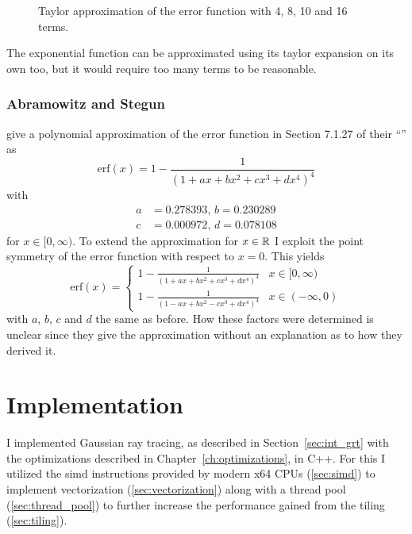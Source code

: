 \documentclass[a4paper, 11pt]{memoir}
\newcommand*{\erf}{\text{erf}}
\begin{document}
    \begin{figure}[t]
        \centering
        
        \caption{Taylor approximation of the error function with 4, 8, 10 and 16 terms.}
        \label{fig:taylor_erf}
    \end{figure}

    The exponential function can be approximated using its taylor expansion on its own too, but it would require too
    many terms to be reasonable.

    \subsection{Abramowitz and Stegun}
    \label{sec:abrasteg}
    \citeauthor{AbraSteg72} give a polynomial approximation of the error function in Section 7.1.27 of their
    \enquote{}\cite{AbraSteg72} as
    \begin{equation}
        \erf{(x)} = 1 - \frac{1}{(1 + ax + bx^2 + cx^3 + dx^4)^4}
        \label{eq:abrasteg_positive}
    \end{equation}
    with
    \begin{equation}
        \begin{aligned}
            a &= 0.278393,\,
            b = 0.230289\\
            c &= 0.000972,\,
            d = 0.078108
        \end{aligned}
        \label{eq:abrasteg_defs}
    \end{equation}
    for $x \in [0, \infty)$. To extend the approximation for $x \in \mathbb{R}$ I exploit the point symmetry of the error function
    with respect to $x = 0$. This yields
    \begin{equation}
        \erf{(x)} = \begin{cases}
            1 - \frac{1}{(1 + ax + bx^2 + cx^3 + dx^4)^4} & x \in [0, \infty)\\
            1 - \frac{1}{(1 - ax + bx^2 - cx^3 + dx^4)^4} & x \in (-\infty, 0)
        \end{cases}
        \label{eq:abrasteg}
    \end{equation}
    with $a$, $b$, $c$ and $d$ the same as before. How these factors were determined is unclear since they give the
    approximation without an explanation as to how they derived it.
    
    \chapter{Implementation}
    \label{ch:implementation}
    I implemented Gaussian ray tracing, as described in Section~\ref{sec:int_grt} with the optimizations described in
    Chapter~\ref{ch:optimizations}, in C++. For this I utilized the \gls{simd} instructions provided by modern x64 CPUs
    (\ref{sec:simd}) to implement vectorization (\ref{sec:vectorization}) along with a thread pool
    (\ref{sec:thread_pool}) to further increase the performance gained from the tiling (\ref{sec:tiling}).
\end{document}
